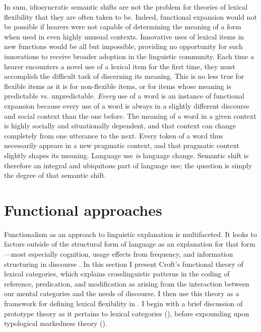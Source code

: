 In sum, idiosyncratic semantic shifts are not the problem for theories of lexical flexibility that they are often taken to be. Indeed, functional expansion would not be possible if hearers were not capable of determining the meaning of a form when used in even highly unusual contexts. Innovative uses of lexical items in new functions would be all but impossible, providing no opportunity for such innovations to receive broader adoption in the linguistic community. Each time a hearer encounters a novel use of a lexical item for the first time, they must accomplish the difficult task of discerning its meaning. This is no less true for flexible items as it is for non-flexible items, or for items whose meaning is predictable vs. unpredictable. \emph{Every} use of a word is an instance of functional expansion because every use of a word is always in a slightly different discourse and social context than the one before. The meaning of a word in a given context is highly socially and situationally dependent, and that context can change completely from one utterance to the next. Every token of a word thus necessarily appears in a new pragmatic context, and that pragmatic context slightly shapes its meaning. Language use \emph{is} language change. Semantic shift is therefore an integral and ubiquitous part of language use; the question is simply the degree of that semantic shift.

\section{Functional approaches}
\label{sec:2.4}

Functionalism as an approach to linguistic explanation is multifaceted. It looks to factors outside of the structural form of language as an explanation for that form—most especially cognition, usage effects from frequency, and information structuring in discourse \parencite[6323--6324]{Croft2001a}. In this section I present Croft's \parencites*{Croft1991}{Croft2000}{Croft2001b} functional theory of lexical categories, which explains crosslinguistic patterns in the coding of reference, predication, and modification as arising from the interaction between our mental categories and the needs of discourse. I then use this theory as a framework for defining lexical flexibility in . I begin with a brief discussion of prototype theory as it pertains to lexical categories (), before expounding upon typological markedness theory ().

